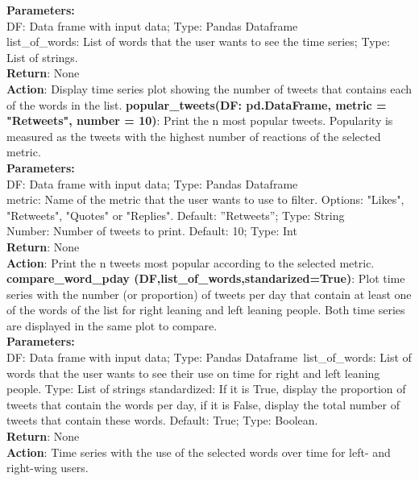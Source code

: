 \textbf{Parameters:}\\
DF: Data frame with input data; Type: Pandas Dataframe\\
list\_of\_words: List of words that the user wants to see the time series; Type: List of strings.\\
\textbf{Return}: None\\ 
\textbf{Action}: Display time series plot showing the number of  tweets that contains each of the words in the list.
\newline
\newline
\noindent\textbf{popular\_tweets(DF: pd.DataFrame, metric = "Retweets", number = 10)}: Print the n most popular tweets. Popularity is measured as the tweets with the highest number of reactions of the selected metric.\\
\textbf{Parameters:}\\
DF: Data frame with input data; Type: Pandas Dataframe\\
metric: Name of the metric that the user wants to use to filter. Options: "Likes", "Retweets", "Quotes" or "Replies". Default: ”Retweets”; Type: String\\
Number: Number of tweets to print. Default: 10; Type: Int\\
\textbf{Return}: None\\ 
\textbf{Action}: Print the n tweets most popular according to the selected metric.
\newline
\newline
\noindent\textbf{compare\_word\_pday (DF,list\_of\_words,standarized=True)}: Plot time series with the number (or proportion) of tweets per day that contain at least one of the words of the list for right leaning and left leaning people. Both time series are displayed in the same plot to compare.\\ 
\textbf{Parameters:}\\
DF: Data frame with input data; Type: Pandas Dataframe\
list\_of\_words: List of words that the user wants to see their use on time for right and left leaning people. Type: List of strings
standardized: If it is True, display the proportion of tweets that contain the words per day, if it is False, display the total number of tweets that contain these words. Default: True; Type: Boolean.\\
\textbf{Return}: None\\ 
\textbf{Action}: Time series with the use of the selected words over time for left- and right-wing users.


